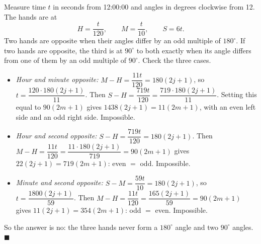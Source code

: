 Measure time $t$ in seconds from 12:00:00 and angles in degrees clockwise from 12. The hands are at
\[H=\dfrac{t}{120},\qquad M=\dfrac{t}{10},\qquad S=6t.\]
Two hands are opposite when their angles differ by an odd multiple of $180^\circ$. If two hands are opposite, the third is at $90^\circ$ to both exactly when its angle differs from one of them by an odd multiple of $90^\circ$. Check the three cases.
\begin{itemize}
\item \emph{Hour and minute opposite:} $M-H=\dfrac{11t}{120}=180(2j+1)$, so $t=\dfrac{120\cdot180(2j+1)}{11}$. Then $S-H=\dfrac{719t}{120}=\dfrac{719\cdot180(2j+1)}{11}$. Setting this equal to $90(2m+1)$ gives $1438(2j+1)=11(2m+1)$, with an even left side and an odd right side. Impossible.
\item \emph{Hour and second opposite:} $S-H=\dfrac{719t}{120}=180(2j+1)$. Then $M-H=\dfrac{11t}{120}=\dfrac{11\cdot180(2j+1)}{719}=90(2m+1)$ gives $22(2j+1)=719(2m+1)$: even $=$ odd. Impossible.
\item \emph{Minute and second opposite:} $S-M=\dfrac{59t}{10}=180(2j+1)$, so $t=\dfrac{1800(2j+1)}{59}$. Then $M-H=\dfrac{11t}{120}=\dfrac{165(2j+1)}{59}=90(2m+1)$ gives $11(2j+1)=354(2m+1)$: odd $=$ even. Impossible.
\end{itemize}
So the answer is $\boxed{\text{no}}$: the three hands never form a $180^\circ$ angle and two $90^\circ$ angles. $\blacksquare$
